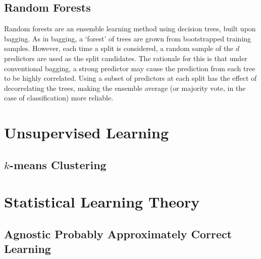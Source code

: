 \documentclass[11pt]{report} %
\begin{document}
\subsection{Random Forests}

Random forests are an ensemble learning method using decision trees, built upon bagging. As in bagging, a `forest' of trees are grown from bootstrapped training samples. However, each time a split is considered, a random sample of the $d$ predictors are used as the split candidates. The rationale for this is that under conventional bagging, a strong predictor may cause the prediction from each tree to be highly correlated. Using a subset of predictors at each split has the effect of decorrelating the trees, making the ensemble average (or majority vote, in the case of classification) more reliable.

\section{Unsupervised Learning}

\subsection{$k$-means Clustering}

\section{Statistical Learning Theory}

\subsection{Agnostic Probably Approximately Correct Learning \cite{Shalev-Shwartz2014}}
\end{document}
